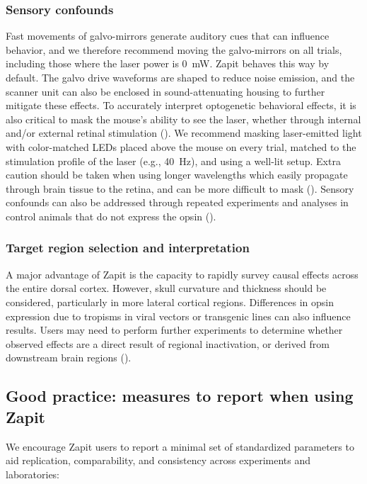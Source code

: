 \documentclass[9pt,lineno]{elife}
\begin{document}
\subsubsection{Sensory confounds}
Fast movements of galvo-mirrors generate auditory cues that can influence behavior, and we therefore recommend moving the galvo-mirrors on all trials, including those where the laser power is 0~mW.
Zapit behaves this way by default.
The galvo drive waveforms are shaped to reduce noise emission, and the scanner unit can also be enclosed in sound-attenuating housing to further mitigate these effects.
To accurately interpret optogenetic behavioral effects, it is also critical to mask the mouse's ability to see the laser, whether through internal and/or external retinal stimulation (\citealp{Danskin2015OptogeneticsArtifact, Weiler2026ProtocolVivo}).
We recommend masking laser-emitted light with color-matched LEDs placed above the mouse on every trial, matched to the stimulation profile of the laser (e.g., 40~Hz), and using a well-lit setup.
Extra caution should be taken when using longer wavelengths which easily propagate through brain tissue to the retina, and can be more difficult to mask (\citealp{Danskin2015OptogeneticsArtifact, Weiler2026ProtocolVivo}).
Sensory confounds can also be addressed through repeated experiments and analyses in control animals that do not express the opsin (\citealp{Gauld2025AActions}).

\subsubsection{Target region selection and interpretation}
A major advantage of Zapit is the capacity to rapidly survey causal effects across the entire dorsal cortex.
However, skull curvature and thickness should be considered, particularly in more lateral cortical regions.
Differences in opsin expression due to tropisms in viral vectors or transgenic lines can also influence results.
Users may need to perform further experiments to determine whether observed effects are a direct result of regional inactivation, or derived from downstream brain regions (\citealp{Wolff2018TheManipulations, Allen2017ApplicationSignaling}).

\subsection{Good practice: measures to report when using Zapit}
We encourage Zapit users to report a minimal set of standardized parameters to aid replication, comparability, and consistency across experiments and laboratories:
\end{document}
